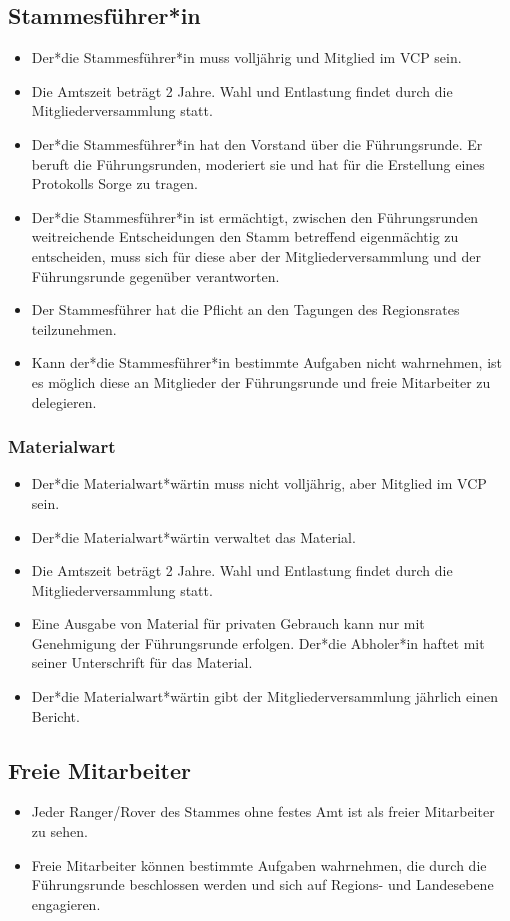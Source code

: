 \documentclass[a4paper]{article}
\begin{document}
    \subsection{Stammesführer*in}
	\begin{itemize}
		\item Der*die Stammesführer*in muss volljährig und Mitglied im VCP sein. 
		\item Die Amtszeit beträgt 2 Jahre. Wahl und Entlastung findet durch die Mitgliederversammlung statt.
		\item Der*die Stammesführer*in hat den Vorstand über die Führungsrunde. Er beruft die Führungsrunden, moderiert sie und hat für die Erstellung eines Protokolls Sorge zu tragen. 
		\item Der*die Stammesführer*in ist ermächtigt, zwischen den Führungsrunden weitreichende Entscheidungen den Stamm betreffend eigenmächtig zu entscheiden, muss sich für diese aber der Mitgliederversammlung und der Führungsrunde gegenüber verantworten. 
		\item Der Stammesführer hat die Pflicht an den Tagungen des Regionsrates teilzunehmen. 
		\item Kann der*die Stammesführer*in bestimmte Aufgaben nicht wahrnehmen, ist es möglich diese an Mitglieder der Führungsrunde und freie Mitarbeiter zu delegieren. 
	\end{itemize}
    
    \subsubsection{Materialwart}
	\begin{itemize}
		\item Der*die Materialwart*wärtin muss nicht volljährig, aber Mitglied im VCP sein. 
		\item Der*die Materialwart*wärtin verwaltet das Material. 
        \item Die Amtszeit beträgt 2 Jahre. Wahl und Entlastung findet durch die Mitgliederversammlung statt.
		\item Eine Ausgabe von Material für privaten Gebrauch kann nur mit Genehmigung der Führungsrunde erfolgen. Der*die Abholer*in haftet mit seiner Unterschrift für das Material. 
		\item Der*die Materialwart*wärtin gibt der Mitgliederversammlung jährlich einen Bericht. 
	\end{itemize}
    
    \subsection{Freie Mitarbeiter}
	\begin{itemize}
		\item Jeder Ranger/Rover des Stammes ohne festes Amt ist als freier Mitarbeiter zu sehen. 
		\item Freie Mitarbeiter können bestimmte Aufgaben wahrnehmen, die durch die Führungsrunde beschlossen werden und sich auf Regions- und Landesebene engagieren. 
	\end{itemize}
\end{document}
